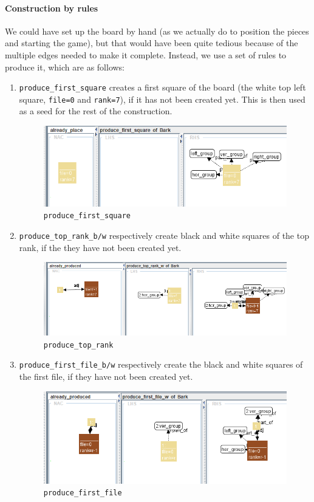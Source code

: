 \documentclass[a4paper, 10pt]{scrartcl}
\begin{document}
    \paragraph{Construction by rules} We could have set up the board by hand (as we actually do to position the pieces and starting the game), but that would have been quite tedious because of the multiple edges needed to make it complete. Instead, we use a set of rules to produce it, which are as follows:
    \begin{enumerate}
        \item \texttt{produce\_first\_square} creates a first square of the board (the white top left square, \texttt{file=0} and \texttt{rank=7}), if it has not been created yet. This is then used as a seed for the rest of the construction.
        \begin{figure}[H]
            \centering
            \includegraphics[width=.8\linewidth]{images/produce_first_square.png}
            \caption{\texttt{produce\_first\_square}}
        \end{figure}

        \item \texttt{produce\_top\_rank\_b/w} respectively create black and white squares of the top rank, if the they have not been created yet.
        \begin{figure}[H]
            \centering
            \includegraphics[width=.8\linewidth]{images/produce_top_rank.png}
            \caption{\texttt{produce\_top\_rank}}
        \end{figure}

        \item \texttt{produce\_first\_file\_b/w} respectively create the black and white squares of the first file, if they have not been created yet.
        \begin{figure}[H]
            \centering
            \includegraphics[width=.8\linewidth]{images/produce_first_file.png}
            \caption{\texttt{produce\_first\_file}}
        \end{figure}
    \end{enumerate}
\end{document}
